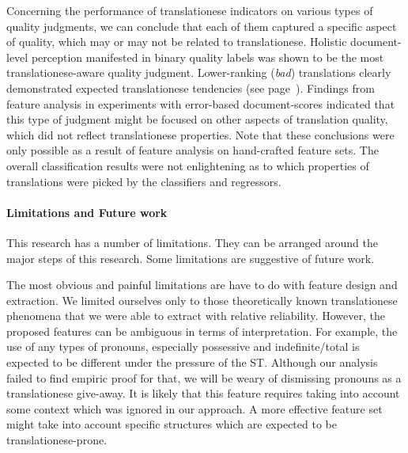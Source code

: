 Concerning the performance of translationese indicators on various types of quality judgments, we can conclude that each of them captured a specific aspect of quality, which may or may not be related to translationese. Holistic document-level perception manifested in binary quality labels was shown to be the most translationese-aware quality judgment.
Lower-ranking (\textit{bad}) translations clearly demonstrated expected translationese tendencies (see page~\pageref{pg:bad_tendencies}).
Findings from feature analysis in experiments with error-based document-scores indicated that this type of judgment might be focused on other aspects of translation quality, which did not reflect translationese properties.
Note that these conclusions were only possible as a result of feature analysis on hand-crafted feature sets. The overall classification results were not enlightening as to which properties of translations were picked by the classifiers and regressors. 


\paragraph{Limitations and Future work}
This research has a number of limitations. They can be arranged around the major steps of this research.
Some limitations are suggestive of future work.
 
The most obvious and painful limitations are have to do with feature design and extraction. We limited ourselves only to those theoretically known translationese phenomena that we were able to extract with relative reliability. 
However, the proposed features can be ambiguous in terms of interpretation.
For example, the use of any types of pronouns, especially possessive and indefinite/total is expected to be different under the pressure of the ST. Although our analysis failed to find empiric proof for that, we will be weary of dismissing pronouns as a translationese give-away. It is likely that this feature requires taking into account some context which was ignored in our approach. A more effective feature set might take into account specific structures which are expected to be translationese-prone.

